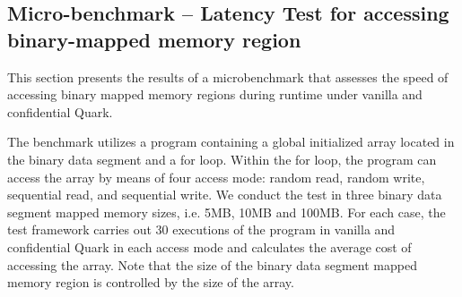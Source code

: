 \subsection{Micro-benchmark – Latency Test for accessing binary-mapped memory region}\label{accesiing_binary_mapped_memory}

This section presents the results of a microbenchmark that assesses the speed of accessing binary mapped memory regions during runtime under vanilla and confidential Quark.

    
     
     
     



 

The benchmark utilizes a program\cite*{benchamark_micro} containing a global initialized array located in the binary data segment and a for loop. Within the for loop, the program can access the array by means of four access mode: random read, random write, sequential read, and sequential write. 
We conduct the test in three binary data segment mapped memory sizes, i.e. 5MB, 10MB and 100MB. For each case, the test framework carries out 30 executions of the program in vanilla and confidential Quark in each access mode and calculates the average cost of accessing the array. Note that the size of the binary data 
segment mapped memory region is controlled by the size of the array.


